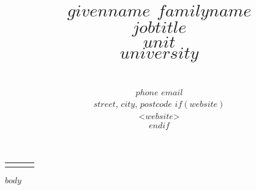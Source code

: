 \documentclass[11pt, legal]{article}
\title{{\huge\bfseries $givenname$ $familyname$}\\[0.1in]{\normalsize {\bfseries $jobtitle$}\\$unit$\\[-0.1in]$university$}} %
\date{} %
\author{\\[-0.40in]{\normalsize $phone$ \hspace{0.35in} $email$}\\ %
{\normalsize $street$, $city$, $postcode$} %
$if(website)$\\{\normalsize <$website$>}\\$endif$ } %
\begin{document}
\newlength{\backupparskip}
\setlength{\backupparskip}{\parskip}
\setlength{\parskip}{0pt}
\maketitle
\begin{raggedright}
	\vspace{-0.25in}
	\thispagestyle{empty}
	\begin{tabu} to   \end{tabu}
	\setlength{\parskip}{\backupparskip}
	\vspace{-0.5in}
	$body$
\end{raggedright}
\end{document}
